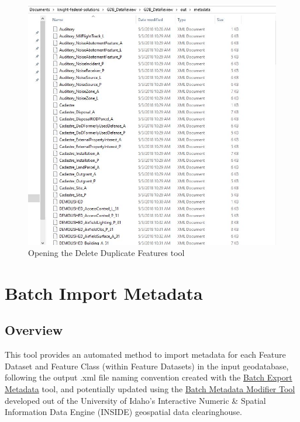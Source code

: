 \documentclass[openany]{book}
\theoremstyle{definition}
\theoremstyle{definition}
\theoremstyle{definition}
\theoremstyle{remark}
\begin{document}
\begin{figure}[H]

{\centering \includegraphics{figures/exMeta-after} 

}

\caption{Opening the Delete Duplicate Features tool}\label{fig:exMetaafter}
\end{figure}

\hypertarget{imMeta}{\chapter{Batch Import Metadata}\label{imMeta}}

\section{Overview}\label{overview-11}

This tool provides an automated method to import metadata for each
Feature Dataset and Feature Class (within Feature Datasets) in the input
geodatabase, following the output .xml file naming convention created
with the \protect\hyperlink{exMeta}{Batch Export Metadata} tool, and
potentially updated using the
\href{http://insideidaho.org/helpdocs/batch_metadata_modifier_tool.html}{Batch
Metadata Modifier Tool} developed out of the University of Idaho's
Interactive Numeric \& Spatial Information Data Engine (INSIDE)
geospatial data clearinghouse.
\end{document}
